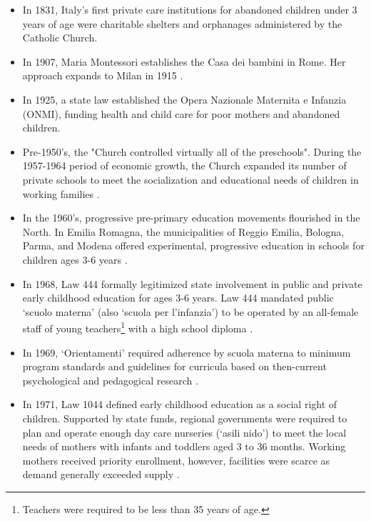 \documentclass{article}
\theoremstyle{definition}
\theoremstyle{remark}
\begin{document}
\begin{itemize}

\item In 1831, Italy's first private care institutions for abandoned children under 3 years of age were charitable shelters and orphanages administered by the Catholic Church. 

\item In 1907, Maria Montessori establishes the Casa dei bambini in Rome. Her approach expands to Milan in 1915 \citep{OECD_2001_Italy-Country-Note}.

\item In 1925, a state law established the Opera Nazionale Maternita e Infanzia (ONMI), funding health and child care for poor mothers and abandoned children.

\item Pre-1950's, the "Church controlled virtually all of the preschools". During the 1957-1964 period of economic growth, the Church expanded its number of private schools to meet the socialization and educational needs of children in working families \citep{Corsaro_1996_Early-nuEdu}.

\item In the 1960's, progressive pre-primary education movements flourished in the North. In Emilia Romagna, the municipalities of Reggio Emilia, Bologna, Parma, and Modena offered experimental, progressive education in schools for children ages 3-6 years \citep{OECD_2001_Italy-Country-Note}.

\item In 1968, Law 444 formally legitimized state involvement in public and private early childhood education for ages 3-6 years. Law 444 mandated public `scuolo materna' (also `scuola per l'infanzia') to be operated by an all-female staff of young teachers\footnote{Teachers were required to be less than 35 years of age.} with a high school diploma \citep{OECD_2001_Italy-Country-Note}.

\item In 1969, `Orientamenti' required adherence by scuola materna to minimum program standards and guidelines for curricula based on then-current psychological and pedagogical research \citep{Corsaro_1996_Early-nuEdu}. 

\item In 1971, Law 1044 defined early childhood education as a social right of children. Supported by state funds, regional governments were required to plan and operate enough day care nurseries (`asili nido') to meet the local needs of mothers with infants and toddlers aged 3 to 36 months. Working mothers received priority enrollment, however, facilities were scarce as demand generally exceeded supply \citep{Saraceno_1984_Soc-Probs}.  


\end{itemize}
\end{document}
